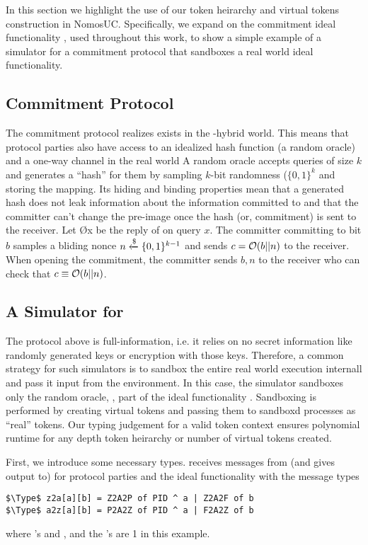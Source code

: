 In this section we highlight the use of our token heirarchy and virtual tokens construction in NomosUC.
Specifically, we expand on the commitment ideal functionality \Fcom, used throughout this work, to show a simple example of a simulator for a commitment protocol that sandboxes a real world ideal functionality. 

\subsection{Commitment Protocol}
The commitment protocol realizes \Fcom exists in the \Fropp-hybrid world. This means that protocol parties also have access to an idealized hash function (a random oracle) and a one-way channel \Fropp in the real world 
A random oracle accepts queries of size $k$ and generates a ``hash'' for them by sampling $k$-bit randomness ($\{0,1\}^k$ and storing the mapping.
Its hiding and binding properties mean that a generated hash does not leak information about the information committed to and that the committer can't change the pre-image once the hash (or, commitment) is sent to the receiver. 
Let \O{x} be the reply of \Fropp on query $x$. 
The committer committing to bit $b$ samples a bliding nonce $n \xleftarrow{\$} \{0,1\}^{k-1}$ and sends $c = \mathcal{O}(b || n)$ to the receiver. When opening the commitment, the committer sends $b, n$ to the receiver who can check that $c \equiv \mathcal{O}(b || n)$.


\subsection{A Simulator for \Fcom}
The protocol above is full-information, i.e. it relies on no secret information like randomly generated keys or encryption with those keys. 
Therefore, a common strategy for such simulators is to sandbox the entire real world execution internall and pass it input from the environment.
In this case, the simulator \simcom sandboxes only the random oracle, \Fro, part of the ideal functionality \Fropp.
Sandboxing is performed by creating virtual tokens and passing them to sandboxd processes as ``real'' tokens. 
Our typing judgement for a valid token context ensures polynomial runtime for any depth token heirarchy or number of virtual tokens created. 

First, we introduce some necessary types. 
\simcom receives messages from (and gives output to) \Z for protocol parties and the ideal functionality with the message types

\begin{lstlisting}[basicstyle=\footnotesize\BeraMonottFamily, mathescape]
$\Type$ z2a[a][b] = Z2A2P of PID ^ a | Z2A2F of b 
$\Type$ a2z[a][b] = P2A2Z of PID ^ a | F2A2Z of b
\end{lstlisting}
where 's  and , and the 's are 1 in this example. 

